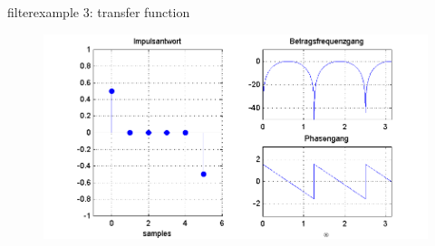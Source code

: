 	\begin{frame}{filter}{example 3: transfer function}
		\begin{figure}
			\centerline{\includegraphics[scale=.5]{graph/fx_03}}
		    \label{fig:fx_03}
		\end{figure}
	\end{frame}	
	
